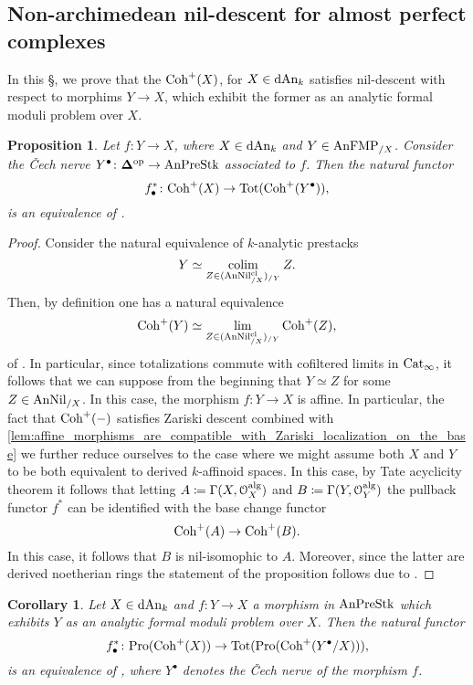 \documentclass[10pt,a4paper,reqno]{amsart} %
\theoremstyle{plain}
\newtheorem{prop}[thm]{Proposition}
\newtheorem{cor}[thm]{Corollary}
\theoremstyle{definition}
\theoremstyle{remark}
\numberwithin{equation}{section}
\begin{document}
\subsection{Non-archimedean nil-descent for almost perfect complexes}
In this \S, we prove that the \infcat $\mathrm{Coh}^+(X)$, for $X \in \mathrm{dAn}_k$ satisfies nil-descent with respect to morphims $Y \to X$, which exhibit
the former as an analytic formal moduli problem over $X$.

\begin{prop} \label{prop:nil_descent_for_Coh^+}
    Let $f \colon Y \to X$, where $X \in \mathrm{dAn}_k$ and $Y \in \mathrm{AnFMP}_{/X}$. Consider the \v{C}ech nerve
    $Y^\bullet \colon \mathbf \Delta ^\mathrm{op} \to \mathrm{AnPreStk}$ associated to $f$.
    Then the natural functor
        \[
            f_\bullet^* \colon \mathrm{Coh}^+(X) \to \mathrm{Tot}(\mathrm{Coh}^+(Y^\bullet)),  
        \]
    is an equivalence of \infcats.
\end{prop}

\begin{proof}
    Consider the natural equivalence of $k$-analytic prestacks
        \[
            Y \simeq \operatorname*{colim}_{Z \in (\mathrm{AnNil}^{\mathrm{cl}}_{/X})_{/Y}}  Z.
        \]
    Then, by definition one has a natural equivalence
        \[
            \mathrm{Coh}^+(Y) \simeq \lim_{Z \in (\mathrm{AnNil}^{\mathrm{cl}}_{/X})_{/Y}} \mathrm{Coh}^+(Z),  
        \]
    of \infcats. In particular, since totalizations commute with cofiltered limits in $\mathrm{Cat}_\infty$, it follows that we can suppose from
    the beginning that $Y \simeq Z$ for some $Z \in \mathrm{AnNil}_{/X}$. In this case, the morphism $f \colon Y \to X$ is affine. In particular, the fact that
    $\mathrm{Coh}^+(-)$ satisfies Zariski descent combined with \cref{lem:affine_morphisms_are_compatible_with_Zariski_localization_on_the_base} we further reduce ourselves
    to the case where we might assume both $X$ and $Y$ to be both equivalent to derived $k$-affinoid spaces. In this case, by Tate acyclicity
    theorem it follows that letting $A \coloneqq \Gamma(X, \mathcal O_X ^\mathrm{alg})$ and $B \coloneqq \Gamma(Y, \mathcal O_Y^\mathrm{alg})$ the pullback functor $f^*$ can be identified with
    the base change functor
        \[
            \mathrm{Coh}^+(A) \to \mathrm{Coh}^+(B).  
        \]
    In this case, it follows that $B$ is nil-isomophic to $A$. Moreover, since the latter are derived noetherian rings
    the statement of the proposition follows due to \cite[Theorem 3.3.1]{preygel_Leistner_Mapping_stacks_properness}.
\end{proof}

\begin{cor}
    Let $X \in \mathrm{dAn}_k$ and $f \colon Y \to X$ a morphism in $\mathrm{AnPreStk}$ which exhibits $Y$ as an analytic formal moduli problem over $X$.
    Then the natural functor 
        \[
            f_\bullet^* \colon \mathrm{Pro}(\mathrm{Coh}^+ (X)) \to \mathrm{Tot}(\mathrm{Pro}(\mathrm{Coh}^+(Y^\bullet/X))),
        \]
    is an equivalence of \infcats, where $Y^\bullet$ denotes the \v{C}ech nerve of the morphism $f$.
\end{cor}
\end{document}

